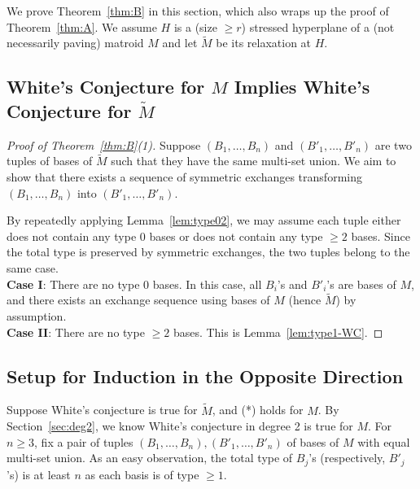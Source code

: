 \documentclass{amsart}
\begin{document}
We prove Theorem~\ref{thm:B} in this section, which also wraps up the proof of Theorem~\ref{thm:A}. We assume $H$ is a (size $\geq r$) stressed hyperplane of a (not necessarily paving) matroid $M$ and let $\widetilde{M}$ be its relaxation at $H$.

\subsection{White's Conjecture for $M$ Implies White's Conjecture for $\widetilde{M}$}

\begin{proof} [Proof of Theorem~\ref{thm:B}(1)]
Suppose $(B_1,\dots,B_n)$ and $(B'_1,\dots,B'_n)$ are two tuples of bases of $\widetilde{M}$ such that they have the same multi-set union.  
We aim to show that there exists a sequence of symmetric exchanges transforming $(B_1,\dots,B_n)$ into $(B'_1,\dots,B'_n)$.

By repeatedly applying Lemma~\ref{lem:type02}, we may assume each tuple either does not contain any type 0 bases or does not contain any type $\geq 2$ bases. Since the total type is preserved by symmetric exchanges, the two tuples belong to the same case.\\

{\bf Case I}: There are no type 0 bases. In this case, all $B_i$'s and $B'_i$'s are bases of $M$, and there exists an exchange sequence using bases of $M$ (hence $\widetilde{M}$) by assumption.\\

{\bf Case II}: There are no type $\geq 2$ bases. This is Lemma~\ref{lem:type1-WC}.
\end{proof}

\subsection{Setup for Induction in the Opposite Direction} \label{sec:induct}

Suppose White's conjecture is true for $\widetilde{M}$, and (*) holds for $M$. By Section~\ref{sec:deg2}, we know White's conjecture in degree 2 is true for $M$. For $n\geq 3$, fix a pair of tuples $(B_1,\ldots,B_n), (B'_1,\ldots,B'_n)$ of bases of $M$ with equal multi-set union. As an easy observation, the total type of $B_j$'s (respectively, $B'_j$'s) is at least $n$ as each basis is of type $\geq 1$.
\end{document}
